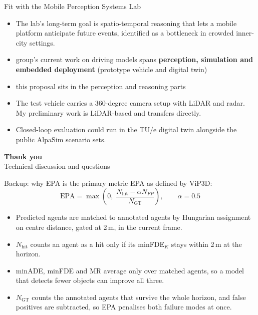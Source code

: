 \documentclass[aspectratio=169,11pt,t]{beamer}
\newcommand{\refcite}[1]{\textcolor{tuered}{\scriptsize\cite{#1}}}
\begin{document}
\begin{frame}{Fit with the Mobile Perception Systems Lab}
  \begin{itemize}
    \item The lab's long-term goal is spatio-temporal reasoning that lets a
      mobile platform anticipate future events, identified as a bottleneck in
      crowded inner-city settings. 
    \item group's current work on driving models spans \textbf{perception, simulation and embedded deployment} (prototype vehicle and digital twin)
    \item this proposal sits in the perception and reasoning parts 
    \item The test vehicle carries a 360-degree camera setup with LiDAR and
      radar. My preliminary work is
      LiDAR-based and transfers directly.
    \item Closed-loop evaluation could run in the TU/e digital twin alongside
      the public AlpaSim scenario sets.
  \end{itemize}
\end{frame}

{
\begin{frame}[plain]
  \vfill
  \centering
  {\color{white}\Huge\textbf{Thank you}}\\[1.0em]
  {\color{white}\large Technical discussion and questions}
  \vfill
\end{frame}
}

\appendix

\begin{frame}[label=epabackup]{Backup: why EPA is the primary metric}
  \vspace{-0.3em}
  EPA as defined by ViP3D\refcite{Gu2023ViP3D}:
  \[
    \mathrm{EPA} = \max\!\left(0,\;
      \frac{N_{\text{hit}} - \alpha N_{FP}}{N_{\mathrm{GT}}}\right),
    \qquad \alpha = 0.5
  \]
  \begin{itemize}
    \item Predicted agents are matched to annotated agents by Hungarian
      assignment on centre distance, gated at 2\,m, in the current frame.
    \item $N_{\text{hit}}$ counts an agent as a hit only if its minFDE$_K$
      stays within 2\,m at the horizon.
    \item minADE, minFDE and MR average \alert{only over matched agents}, so a
      model that detects fewer objects can improve all three.
    \item $N_{\mathrm{GT}}$ counts the annotated agents that survive the whole
      horizon, and false positives are subtracted, so EPA penalises both
      failure modes at once.
  \end{itemize}
\end{frame}
\end{document}
